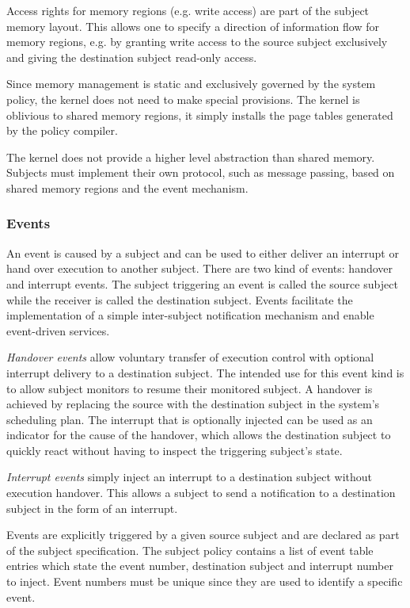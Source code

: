Access rights for memory regions (e.g. write access) are part of the subject
memory layout. This allows one to specify a direction of information flow for
memory regions, e.g. by granting write access to the source subject exclusively
and giving the destination subject read-only access.

Since memory management is static and exclusively governed by the system policy,
the kernel does not need to make special provisions. The kernel is oblivious to
shared memory regions, it simply installs the page tables generated by the
policy compiler.

The kernel does not provide a higher level abstraction than shared memory.
Subjects must implement their own protocol, such as message passing, based on
shared memory regions and the event mechanism.

\subsubsection{Events}\label{subsubsec:events}
An event is caused by a subject and can be used to either deliver
an interrupt or hand over execution to another subject. There are two kind of
events: handover and interrupt events. The subject triggering an event is
called the source subject while the receiver is called the destination subject.
Events facilitate the implementation of a simple inter-subject notification
mechanism and enable event-driven services.

\emph{Handover events} allow voluntary transfer of
execution control with optional interrupt delivery to a destination subject.
The intended use for this event kind is to allow subject monitors to resume
their monitored subject. A handover is achieved by replacing the source with
the destination subject in the system's scheduling plan. The interrupt that is
optionally injected can be used as an indicator for the cause of the handover,
which allows the destination subject to quickly react without having to inspect
the triggering subject's state.

\emph{Interrupt events} simply inject an interrupt to a
destination subject without execution handover. This allows a subject to send a
notification to a destination subject in the form of an interrupt.

Events are explicitly triggered by a given source subject and are declared as
part of the subject specification. The subject policy contains a list of event
table entries which state the event number, destination subject and interrupt
number to inject. Event numbers must be unique since they are used to identify a
specific event.

